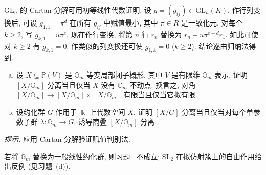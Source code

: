 \begin{remark}\label{src:8.3.3}
$\mathrm{GL}_n$ 的 Cartan 分解可用初等线性代数证明. 设 $g=(g_{ij})\in\mathrm{GL}_n(K)$. 作行列变换后, 可设 $g_{1,1}=\pi^d$ 在所有 $g_{ij}$ 中赋值最小, 其中 $\pi\in R$ 是一致化元. 对每个 $k\geq2$, 写 $g_{k,1}=u\pi^e$. 现在作行变换, 将第 $n$ 行 $r_n$ 替换为 $r_n-u\pi^{e-d}r_1$. 如此可使对 $k\geq2$ 有 $g_{k,1}=0$. 作类似的列变换还可使 $g_{1,k}=0$ ($k\geq2$). 结论遂由归纳法得到.
\end{remark}
\begin{exercise}\label{src:8.3.4}
\begin{enumerate}[(a)]
\item 设 $X\subseteq\mathbb P(V)$ 是 $\mathbb G_m$-等变局部闭子概形, 其中 $V$ 是有限维 $\mathbb G_m$-表示. 证明 $[X/\mathbb G_m]$ 分离当且仅当 $X$ 没有 $\mathbb G_m$-不动点. 换言之, 对角 $[X/\mathbb G_m]\to[X/\mathbb G_m]\times[X/\mathbb G_m]$ 有限当且仅当它拟有限.
\item 设约化群 $G$ 作用于 $\Bbbk$ 上代数空间 $X$. 证明 $[X/G]$ 分离当且仅当对每个单参数子群 $\lambda:\mathbb G_m\to G$, 诱导商叠 $[X/\mathbb G_m]$ 分离.
\end{enumerate}
\textit{提示:} 应用 Cartan 分解验证赋值判别法.
\end{exercise}
\begin{remark}\label{src:8.3.5}
若将 $\mathbb G_m$ 替换为一般线性约化群, 则习题~ 不成立; $\mathrm{SL}_2$ 在拟仿射簇上的自由作用给出反例 (见习题~(d)).
\end{remark}
